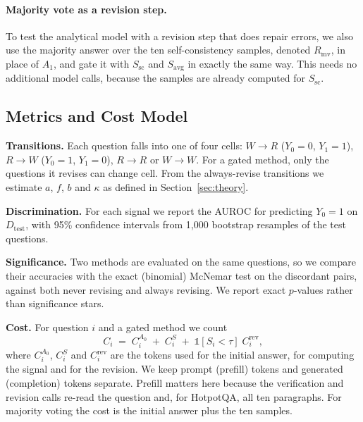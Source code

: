 \paragraph{Majority vote as a revision step.} To test the analytical model with a revision step that does repair errors, we also use the majority answer over the ten self-consistency samples, denoted $R_{\text{mv}}$, in place of $A_1$, and gate it with $S_{\text{sc}}$ and $S_{\text{avg}}$ in exactly the same way. This needs no additional model calls, because the samples are already computed for $S_{\text{sc}}$.

\subsection{Metrics and Cost Model}
\textbf{Transitions.} Each question falls into one of four cells: $W\to R$ ($Y_0=0$, $Y_1=1$), $R\to W$ ($Y_0=1$, $Y_1=0$), $R\to R$ or $W\to W$. For a gated method, only the questions it revises can change cell. From the always-revise transitions we estimate $a$, $f$, $b$ and $\kappa$ as defined in Section~\ref{sec:theory}.

\textbf{Discrimination.} For each signal we report the AUROC for predicting $Y_0=1$ on $D_{\text{test}}$, with 95\% confidence intervals from 1{,}000 bootstrap resamples of the test questions.

\textbf{Significance.} Two methods are evaluated on the same questions, so we compare their accuracies with the exact (binomial) McNemar test on the discordant pairs, against both never revising and always revising. We report exact $p$-values rather than significance stars.

\textbf{Cost.} For question $i$ and a gated method we count
\begin{equation}
C_i \;=\; C_i^{A_0} \;+\; C_i^{S} \;+\; \mathbb{1}[S_i<\tau]\;C_i^{\text{rev}},
\label{eq:cost}
\end{equation}
where $C_i^{A_0}$, $C_i^{S}$ and $C_i^{\text{rev}}$ are the tokens used for the initial answer, for computing the signal and for the revision. We keep prompt (prefill) tokens and generated (completion) tokens separate. Prefill matters here because the verification and revision calls re-read the question and, for HotpotQA, all ten paragraphs. For majority voting the cost is the initial answer plus the ten samples.
